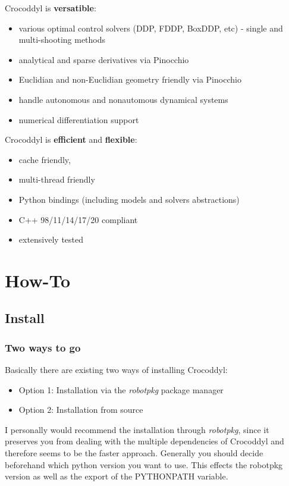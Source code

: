 Crocoddyl is \textbf{versatible}:
\begin{itemize}
\item various optimal control solvers (DDP, FDDP, BoxDDP, etc) - single and multi-shooting methods
\item analytical and sparse derivatives via Pinocchio
\item Euclidian and non-Euclidian geometry friendly via Pinocchio
\item handle autonomous and nonautomous dynamical systems
\item numerical differentiation support
\end{itemize}

Crocoddyl is \textbf{efficient} and \textbf{flexible}:
\begin{itemize}
\item cache friendly,
\item multi-thread friendly
\item Python bindings (including models and solvers abstractions)
\item C++ 98/11/14/17/20 compliant
\item extensively tested
\end{itemize}



\section{How-To}
\subsection{Install}
\subsubsection{Two ways to go}
Basically there are existing two ways of installing Crocoddyl: 
\begin{itemize}
\item Option 1: Installation via the \textit{robotpkg } package manager
\item Option 2: Installation from source
\end{itemize} 
I personally would recommend the installation through \textit{robotpkg}, since it preserves you from dealing with the multiple dependencies of Crocoddyl and therefore seems to be the faster approach. Generally you should decide beforehand which python version you want to use. This effects the robotpkg version as well as the export of the PYTHONPATH variable. 


